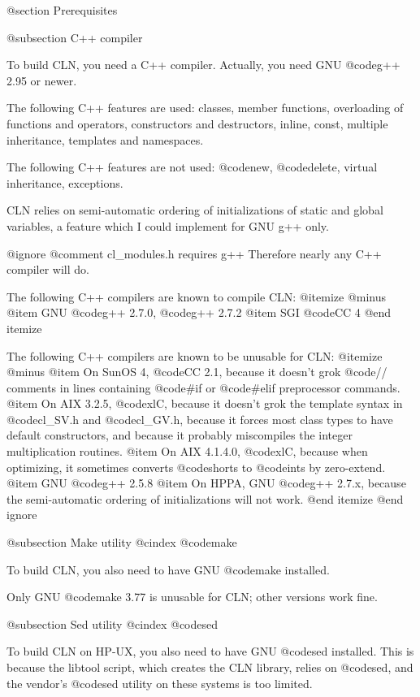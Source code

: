 @section Prerequisites

@subsection C++ compiler

To build CLN, you need a C++ compiler.
Actually, you need GNU @code{g++ 2.95} or newer.

The following C++ features are used:
classes, member functions, overloading of functions and operators,
constructors and destructors, inline, const, multiple inheritance,
templates and namespaces.

The following C++ features are not used:
@code{new}, @code{delete}, virtual inheritance, exceptions.

CLN relies on semi-automatic ordering of initializations
of static and global variables, a feature which I could
implement for GNU g++ only.

@ignore
@comment cl_modules.h requires g++
Therefore nearly any C++ compiler will do.

The following C++ compilers are known to compile CLN:
@itemize @minus
@item
GNU @code{g++ 2.7.0}, @code{g++ 2.7.2}
@item
SGI @code{CC 4}
@end itemize

The following C++ compilers are known to be unusable for CLN:
@itemize @minus
@item
On SunOS 4, @code{CC 2.1}, because it doesn't grok @code{//} comments
in lines containing @code{#if} or @code{#elif} preprocessor commands.
@item
On AIX 3.2.5, @code{xlC}, because it doesn't grok the template syntax
in @code{cl_SV.h} and @code{cl_GV.h}, because it forces most class types
to have default constructors, and because it probably miscompiles the
integer multiplication routines.
@item
On AIX 4.1.4.0, @code{xlC}, because when optimizing, it sometimes converts
@code{short}s to @code{int}s by zero-extend.
@item
GNU @code{g++ 2.5.8}
@item
On HPPA, GNU @code{g++ 2.7.x}, because the semi-automatic ordering of
initializations will not work.
@end itemize
@end ignore

@subsection Make utility
@cindex @code{make}

To build CLN, you also need to have GNU @code{make} installed.

Only GNU @code{make} 3.77 is unusable for CLN; other versions work fine.

@subsection Sed utility
@cindex @code{sed}

To build CLN on HP-UX, you also need to have GNU @code{sed} installed.
This is because the libtool script, which creates the CLN library, relies
on @code{sed}, and the vendor's @code{sed} utility on these systems is too
limited.


